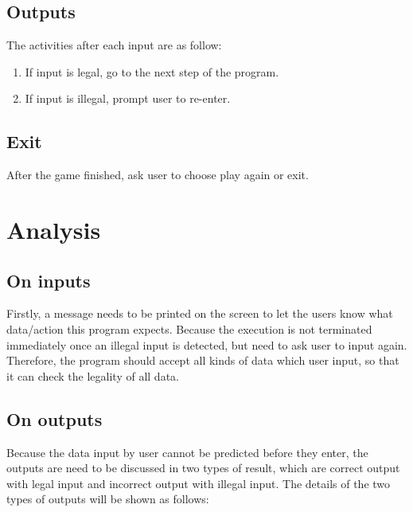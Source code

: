\documentclass[12pt]{article}
\begin{document}
	\subsection{Outputs}
	The activities after each input are as follow:
	
	\begin{enumerate}
	\item If input is legal, go to the next step of the program.	
	\item If input is illegal, prompt user to re-enter.
	\end{enumerate}
	
	\subsection{Exit}
	After the game finished, ask user to choose play again or exit.

	\section{Analysis}
	
	\subsection{On inputs}
	Firstly, a message needs to be printed on the screen to let the users know what data/action this program expects. Because the execution is not terminated immediately once an illegal input is detected, but need to ask user to input again. Therefore, the program should accept all kinds of data which user input, so that it can check the legality of all data.
	
	\subsection{On outputs}
	Because the data input by user cannot be predicted before they enter, the outputs are need to be discussed in two types of result, which are correct output with legal input and incorrect output with illegal input. The details of the two types of outputs will be shown as follows:
	
\end{document}
